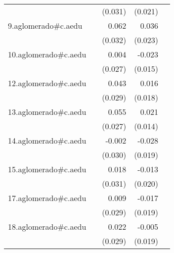 {\begin{longtable}{l*{4}{D{.}{.}{-1}}}
            &                     &     (0.031)         &     (0.021)         &                     \\
\addlinespace
9.aglomerado#c.aedu&                     &       0.062         &       0.036         &                     \\
            &                     &     (0.032)         &     (0.023)         &                     \\
\addlinespace
10.aglomerado#c.aedu&                     &       0.004         &      -0.023         &                     \\
            &                     &     (0.027)         &     (0.015)         &                     \\
\addlinespace
12.aglomerado#c.aedu&                     &       0.043         &       0.016         &                     \\
            &                     &     (0.029)         &     (0.018)         &                     \\
\addlinespace
13.aglomerado#c.aedu&                     &       0.055\sym{*}  &       0.021         &                     \\
            &                     &     (0.027)         &     (0.014)         &                     \\
\addlinespace
14.aglomerado#c.aedu&                     &      -0.002         &      -0.028         &                     \\
            &                     &     (0.030)         &     (0.019)         &                     \\
\addlinespace
15.aglomerado#c.aedu&                     &       0.018         &      -0.013         &                     \\
            &                     &     (0.031)         &     (0.020)         &                     \\
\addlinespace
17.aglomerado#c.aedu&                     &       0.009         &      -0.017         &                     \\
            &                     &     (0.029)         &     (0.019)         &                     \\
\addlinespace
18.aglomerado#c.aedu&                     &       0.022         &      -0.005         &                     \\
            &                     &     (0.029)         &     (0.019)         &                     \\

\end{longtable}}
